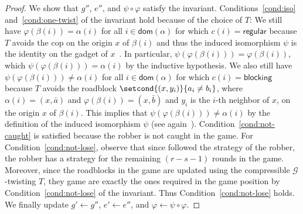 \documentclass[10pt,a4paper]{article}
\newcommand{\regular}{\mathsf{regular}}
\newcommand{\blocking}{\mathsf{blocking}}
\renewcommand{\phi}{\varphi}
\newcommand{\tup}[1]{\bar{#1}}
\newcommand{\graphG}{\mathcal{G}}
\newcommand{\dom}{\mathsf{dom}}
\begin{document}
\begin{proof}
        We show that $g''$, $e''$, and $\psi \circ \phi$ satisfy the invariant.
        Conditions~\ref{cond:iso} and~\ref{cond:one-twist} of the invariant hold because
        of the choice of $T$:
        We still have $\phi(\beta(i)) = \alpha(i)$ for all $i \in \dom(\alpha)$ for which $c(i) = \regular$ because $T$ avoids the cop on the origin $x$ of $\beta(i)$ and thus the induced isomorphism $\psi$ is the identity on the gadget of $x$~\cite[Lemma 13]{DBLP:conf/focs/GroheLNS23}.
        In particular, $\psi(\phi(\beta(i))) = \phi(\beta(i))$, which $\psi(\phi(\beta(i))) = \alpha(i)$ by the inductive hypothesis.
        We also still have $\psi(\phi(\beta(i))) \neq \alpha(i)$ for all $i \in \dom(\alpha)$ for which $c(i) = \blocking$ because $T$ avoids the roadblock $\setcond{(x,y_i)} { a_i \neq b_i}$, where $\alpha(i) = (x,\tup{a})$ and $\phi(\beta(i)) = (x, \tup{b})$ and $y_i$ is the $i$-th neighbor of $x$, on the origin $x$ of $\beta(i)$. This implies that $\psi(\phi(\beta(i))) \neq \alpha(i)$ by the definition of the induced isomorphism $\psi$ (see again~\cite{DBLP:conf/focs/GroheLNS23}).
        Condition~\ref{cond:not-caught} is satisfied because the robber is not caught in the game.
For Condition~\ref{cond:not-lose}, observe that since followed the strategy of the robber, the robber has a  strategy for the remaining $(r-s-1)$ rounds in the game. Moreover, since the roadblocks in the game are updated using the compressible $\graphG$-twisting $T$, they 
        game are exactly the ones required in the game position by Condition~\ref{cond:not-lose} of the invariant.
      Thus Condition~\ref{cond:not-lose} holds.
        We finally update $g' \leftarrow g''$, $e' \leftarrow e''$, and $\phi \leftarrow \psi \circ \phi$.
        

\end{proof}
\end{document}
